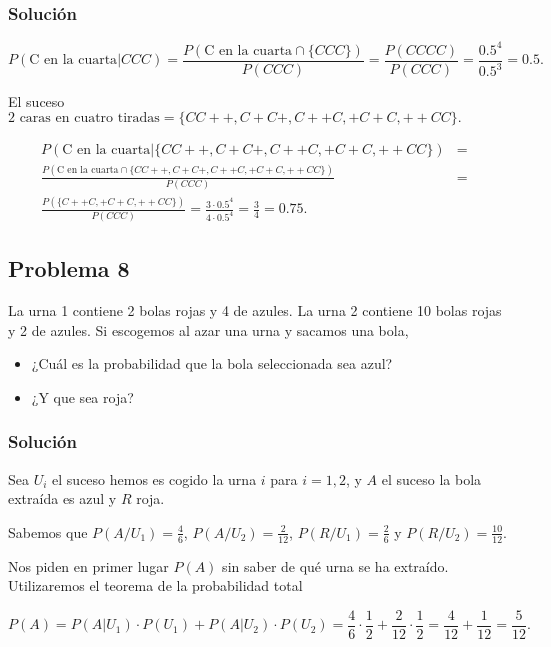\documentclass[
]{article}
\providecommand{\tightlist}{%
  \setlength{\itemsep}{0pt}\setlength{\parskip}{0pt}}
\begin{document}
\hypertarget{soluciuxf3n-7}{%
\subsubsection{Solución}\label{soluciuxf3n-7}}

\[
P(\mbox{C en la cuarta}|CCC)=
\frac{P(\mbox{C en la cuarta}\cap \{CCC\})}{P(CCC)}=
\frac{P(CCCC)}{P(CCC)}=\frac{0.5^4}{0.5^3}=0.5
.\]

El suceso
\(\mbox{2 caras en cuatro tiradas}=\{CC++,C+C+,C++C,+C+C,++CC\}.\)

\begin{eqnarray*}
P(\mbox{C en la cuarta}|\{CC++,C+C+,C++C,+C+C,++CC\})&=&\\
\frac{P(\mbox{C en la cuarta}\cap \{CC++,C+C+,C++C,+C+C,++CC\})}{P(CCC)}&=&\\
\frac{P(\{C++C,+C+C,++CC\})}{P(CCC)}=\frac{3\cdot 0.5^4}{4\cdot 0.5^4}=\frac{3}{4}=0.75.
\end{eqnarray*}

\hypertarget{problema-8}{%
\subsection{Problema 8}\label{problema-8}}

La urna 1 contiene 2 bolas rojas y 4 de azules. La urna 2 contiene 10
bolas rojas y 2 de azules. Si escogemos al azar una urna y sacamos una
bola,

\begin{itemize}
\tightlist
\item
  ¿Cuál es la probabilidad que la bola seleccionada sea azul?
\item
  ¿Y que sea roja?
\end{itemize}

\hypertarget{soluciuxf3n-8}{%
\subsubsection{Solución}\label{soluciuxf3n-8}}

Sea \(U_i\) el suceso hemos es cogido la urna \(i\) para \(i=1,2\), y
\(A\) el suceso la bola extraída es azul y \(R\) roja.

Sabemos que \(P(A/U_1)=\frac{4}{6}\), \(P(A/U_2)=\frac{2}{12}\),
\(P(R/U_1)=\frac{2}{6}\) y \(P(R/U_2)=\frac{10}{12}.\)

Nos piden en primer lugar \(P(A)\) sin saber de qué urna se ha extraído.
Utilizaremos el teorema de la probabilidad total

\[
P(A)=P(A|U_1)\cdot P(U_1)+P(A|U_2)\cdot P(U_2)=
\frac{4}{6}\cdot \frac{1}{2}+\frac{2}{12}\cdot \frac{1}{2}
=\frac{4}{12}+\frac{1}{12}=\frac{5}{12}.
\]
\end{document}

